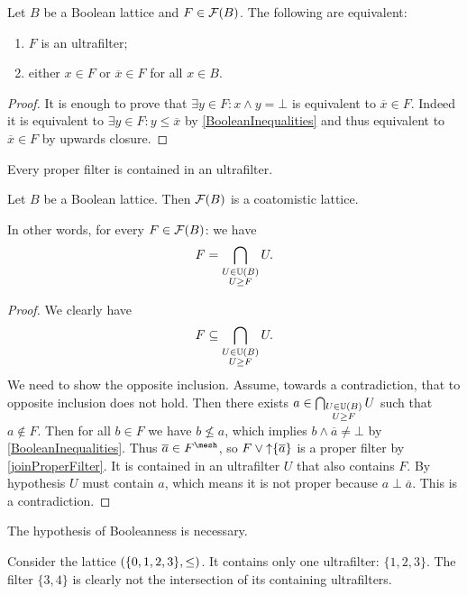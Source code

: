 \begin{corollary} \label{BooleanUltrafilterDisjunction}
Let $B$ be a Boolean lattice and $F\in \operatorname{\mathcal{F}}(B)$. The following are equivalent:
\begin{enumerate}
\item $F$ is an ultrafilter;
\item either $x\in F$ or $\overline{x}\in F$ for all $x\in B$.
\end{enumerate}
\end{corollary}
\begin{proof}
It is enough to prove that $\exists y\in F: x\wedge y = \bot$ is equivalent to $\overline{x}\in F$. Indeed it is equivalent to $\exists y\in F: y \leq \overline{x}$ by \ref{BooleanInequalities} and thus equivalent to $\overline{x}\in F$ by upwards closure.
\end{proof}

\begin{proposition} \label{ultrafilterLemma}
Every proper filter is contained in an ultrafilter.
\end{proposition}
\begin{corollary} \label{filtersCoatomistic}
Let $B$ be a Boolean lattice. Then $\operatorname{\mathcal{F}}(B)$ is a coatomistic lattice.
\end{corollary}
In other words, for every $F\in \operatorname{\mathcal{F}}(B)$: we have
\[ F = \bigcap_{\substack{U\in \operatorname{\mathbb{U}}(B) \\ U\geq F}} U. \]
\begin{proof}
We clearly have
\[ F \subseteq \bigcap_{\substack{U\in \operatorname{\mathbb{U}}(B) \\ U\geq F}} U. \]
We need to show the opposite inclusion. Assume, towards a contradiction, that to opposite inclusion does not hold. Then there exists $a\in \bigcap_{\substack{U\in \operatorname{\mathbb{U}}(B) \\ U\geq F}} U$ such that $a\notin F$. Then for all $b\in F$ we have $b\not\leq a$, which implies $b\wedge \overline{a} \neq \bot$ by \ref{BooleanInequalities}. Thus $\overline{a} \in F^\mesh$, so $F\vee \operatorname{\uparrow}\{\overline{a}\}$ is a proper filter by \ref{joinProperFilter}. It is contained in an ultrafilter $U$ that also contains $F$. By hypothesis $U$ must contain $a$, which means it is not proper because $a\perp \overline{a}$. This is a contradiction.
\end{proof}
The hypothesis of Booleanness is necessary.
\begin{example}
Consider the lattice $\left( \{0,1,2,3\},\leq \right)$. It contains only one ultrafilter: $\{1,2,3\}$. The filter $\{3,4\}$ is clearly not the intersection of its containing ultrafilters.
\end{example}

